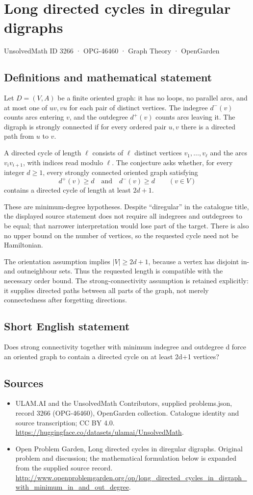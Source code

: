 \documentclass[11pt,a4paper]{article}
\begin{document}
\section*{Long directed cycles in diregular digraphs}\label{3266}
{\small UnsolvedMath ID 3266 · OPG-46460 · Graph Theory · OpenGarden}
\subsection{Definitions and mathematical statement}
Let $D=(V,A)$ be a finite oriented graph: it has no loops, no parallel
arcs, and at most one of $uv,vu$ for each pair of distinct vertices.
The indegree $d^-(v)$ counts arcs entering $v$, and the outdegree $d^+(v)$
counts arcs leaving it. The digraph is strongly connected if for every
ordered pair $u,v$ there is a directed path from $u$ to $v$.

A directed cycle of length $\ell$ consists of $\ell$ distinct vertices
$v_1,\ldots,v_\ell$ and the arcs $v_iv_{i+1}$, with indices read modulo
$\ell$. The conjecture asks whether, for every integer $d\ge1$, every
strongly connected oriented graph satisfying
\[
                  d^+(v)\ge d\quad\text{and}\quad d^-(v)\ge d
                  \qquad(v\in V)
\]
contains a directed cycle of length at least $2d+1$.

These are minimum-degree hypotheses. Despite ``diregular'' in the
catalogue title, the displayed source statement does not require all
indegrees and outdegrees to be equal; that narrower interpretation
would lose part of the target. There is also no upper bound on the
number of vertices, so the requested cycle need not be Hamiltonian.

The orientation assumption implies $|V|\ge2d+1$, because a vertex has
disjoint in- and outneighbour sets. Thus the requested length is compatible
with the necessary order bound. The strong-connectivity assumption is
retained explicitly: it supplies directed paths between all parts of
the graph, not merely connectedness after forgetting directions.
\subsection{Short English statement}
Does strong connectivity together with minimum indegree and outdegree d force an oriented graph to contain a directed cycle on at least 2d+1 vertices?
\subsection{Sources}
\begin{itemize}
\item[S1] ULAM.AI and the UnsolvedMath Contributors, supplied problems.json, record 3266 (OPG-46460), OpenGarden collection. Catalogue identity and source transcription; CC BY 4.0.
\url{https://huggingface.co/datasets/ulamai/UnsolvedMath}.
\item[S2] Open Problem Garden, Long directed cycles in diregular digraphs. Original problem and discussion; the mathematical formulation below is expanded from the supplied source record.
\url{http://www.openproblemgarden.org/op/long_directed_cycles_in_digraph_with_minimum_in_and_out_degree}.
\end{itemize}
\end{document}

